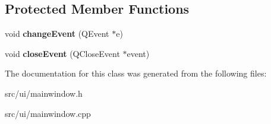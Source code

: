 \subsection*{Protected Member Functions}
\begin{DoxyCompactItemize}
\item 
\hypertarget{classMainWindow_af4ca5d0d3d18ddcb7d54b6596bbf4797}{
void {\bfseries changeEvent} (QEvent $\ast$e)}
\label{classMainWindow_af4ca5d0d3d18ddcb7d54b6596bbf4797}

\item 
\hypertarget{classMainWindow_a4e20a4a065fbb0e4d3532a45a0a91425}{
void {\bfseries closeEvent} (QCloseEvent $\ast$event)}
\label{classMainWindow_a4e20a4a065fbb0e4d3532a45a0a91425}

\end{DoxyCompactItemize}


The documentation for this class was generated from the following files:\begin{DoxyCompactItemize}
\item 
src/ui/mainwindow.h\item 
src/ui/mainwindow.cpp\end{DoxyCompactItemize}
